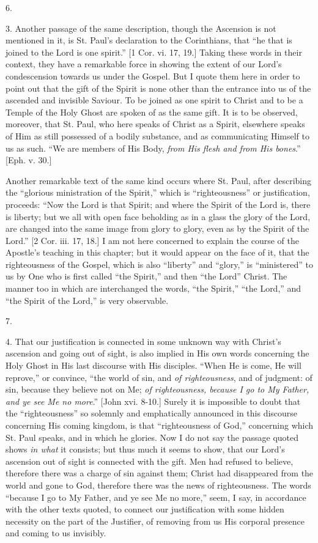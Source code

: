 6.

3. Another passage of the same description, though the Ascension is
not mentioned in it, is St. Paul's declaration to the Corinthians,
that ``he that is joined to the Lord is one spirit.'' [1 Cor.
vi. 17, 19.] Taking these words in their context, they have a
remarkable force in showing the extent of our Lord's condescension
towards us under the Gospel. But I quote them here in order to point
out that the gift of the Spirit is none other than the entrance into
us of the ascended and invisible Saviour. To be joined as one
spirit to Christ and to be a Temple of the Holy Ghost are spoken of as
the same gift. It is to be observed, moreover, that St. Paul, who here
speaks of Christ as a Spirit, elsewhere speaks of Him as still
possessed of a bodily substance, and as communicating Himself to us as
such. ``We are members of His Body, \emph{from His flesh and from His
bones}.'' [Eph. v. 30.]

Another remarkable text of the same kind occurs where St. Paul,
after describing the ``glorious ministration of the Spirit,''
which is ``righteousness'' or justification, proceeds:
``Now the Lord is that Spirit; and where the Spirit of the Lord
is, there is liberty; but we all with open face beholding as in a
glass the glory of the Lord, are changed into the same image from
glory to glory, even as by the Spirit of the Lord.'' [2 Cor. iii.
17, 18.] I am not here concerned to explain the course of the
Apostle's teaching in this chapter; but it would appear on the face of
it, that the righteousness of the Gospel, which is also
``liberty'' and ``glory,'' is ``ministered''
to us by One who is first called ``the Spirit,'' and then
``the Lord'' Christ. The manner too in which are interchanged
the words, ``the Spirit,'' ``the Lord,'' and ``the
Spirit of the Lord,'' is very observable.

7.

4. That our justification is connected in some unknown way with
Christ's ascension and going out of sight, is also implied in His own
words concerning the Holy Ghost in His last discourse with His
disciples. ``When He is come, He will reprove,'' or convince,
``the world of sin, and \emph{of righteousness}, and of
judgment: of sin, because they believe not on Me; \emph{of righteousness,
because I go to My Father, and ye see Me no more}.'' [John xvi.
8-10.] Surely it is impossible to doubt that the
``righteousness'' so solemnly and emphatically announced in
this discourse concerning His coming kingdom, is that
``righteousness of God,'' concerning which St. Paul speaks,
and in which he glories. Now I do not say the passage quoted shows \emph{in
what} it consists; but thus much it seems to show, that our Lord's
ascension out of sight is connected with the gift. Men had refused to
believe, therefore there was a charge of sin against them; Christ had
disappeared from the world and gone to God, therefore there was the
news of righteousness. The words ``because I go to My Father, and
ye see Me no more,'' seem, I say, in accordance with the other
texts quoted, to connect our justification with some hidden necessity
on the part of the Justifier, of removing from us His corporal
presence and coming to us invisibly.

